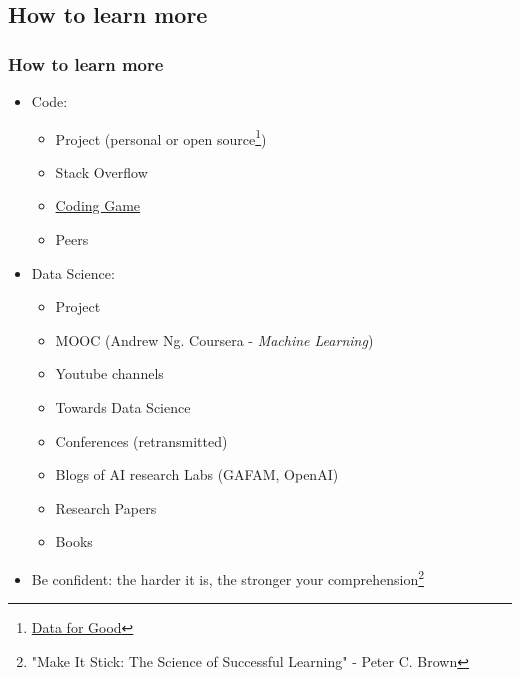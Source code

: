\subsection{How to learn more}
\begin{frame}\frametitle{How to learn more}
   \begin{itemize}
      \item Code:
      \begin{itemize}
         \item Project (personal or open source\footnote{\href{https://dataforgood.fr/}{Data for Good}})
         \item Stack Overflow
         \item \href{https://www.codingame.com/home}{Coding Game}
         \item Peers
      \end{itemize}
      \item Data Science:
      \begin{itemize}
         \item Project
         \item MOOC (Andrew Ng. Coursera - \textit{Machine Learning})
         \item Youtube channels
         \item Towards Data Science
         \item Conferences (retransmitted)
         \item Blogs of AI research Labs (GAFAM, OpenAI)
         \item Research Papers
         \item Books
      \end{itemize}
      \item Be confident: the harder it is, the stronger your comprehension\footnote{"Make It Stick: The Science of Successful Learning" - Peter C. Brown}
   \end{itemize}
\end{frame}


